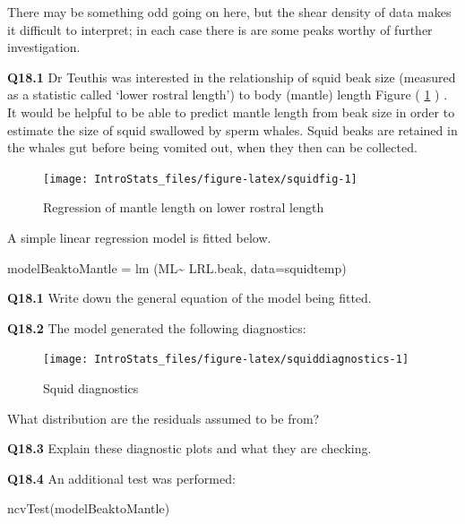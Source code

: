 \documentclass[
  oneside]{krantz}
\newenvironment{Shaded}{\begin{snugshade}}{\end{snugshade}}
\newcommand{\AttributeTok}[1]{\textcolor[rgb]{0.77,0.63,0.00}{#1}}
\newcommand{\FunctionTok}[1]{\textcolor[rgb]{0.00,0.00,0.00}{#1}}
\newcommand{\NormalTok}[1]{#1}
\newcommand{\OtherTok}[1]{\textcolor[rgb]{0.56,0.35,0.01}{#1}}
\newcommand{\SpecialCharTok}[1]{\textcolor[rgb]{0.00,0.00,0.00}{#1}}
\begin{document}
There may be something odd going on here, but the shear density of data makes it difficult to interpret; in each case there is are some peaks worthy of further investigation.

\textbf{Q18.1} Dr Teuthis was interested in the relationship of squid beak size (measured as a statistic called `lower rostral length') to body (mantle) length Figure ( \ref{fig:squidfig} ) . It would be helpful to be able to predict mantle length from beak size in order to estimate the size of squid swallowed by sperm whales. Squid beaks are retained in the whales gut before being vomited out, when they then can be collected.

\begin{figure}

{\centering \texttt{[image: IntroStats\_files/figure-latex/squidfig-1]} 

}

\caption{Regression of mantle length on lower rostral length}\label{fig:squidfig}
\end{figure}

A simple linear regression model is fitted below.

\begin{Shaded}
\begin{Highlighting}[]
\NormalTok{modelBeaktoMantle }\OtherTok{=}  \FunctionTok{lm}\NormalTok{ (ML}\SpecialCharTok{\textasciitilde{}}\NormalTok{ LRL.beak, }\AttributeTok{data=}\NormalTok{squidtemp)}
\end{Highlighting}
\end{Shaded}

\textbf{Q18.1} Write down the general equation of the model being fitted.

\textbf{Q18.2} The model generated the following diagnostics:

\begin{figure}

{\centering \texttt{[image: IntroStats\_files/figure-latex/squiddiagnostics-1]} 

}

\caption{Squid diagnostics}\label{fig:squiddiagnostics}
\end{figure}

What distribution are the residuals assumed to be from?

\textbf{Q18.3} Explain these diagnostic plots and what they are checking.

\textbf{Q18.4} An additional test was performed:

\begin{Shaded}
\begin{Highlighting}[]
\FunctionTok{ncvTest}\NormalTok{(modelBeaktoMantle)}
\end{Highlighting}
\end{Shaded}
\end{document}
